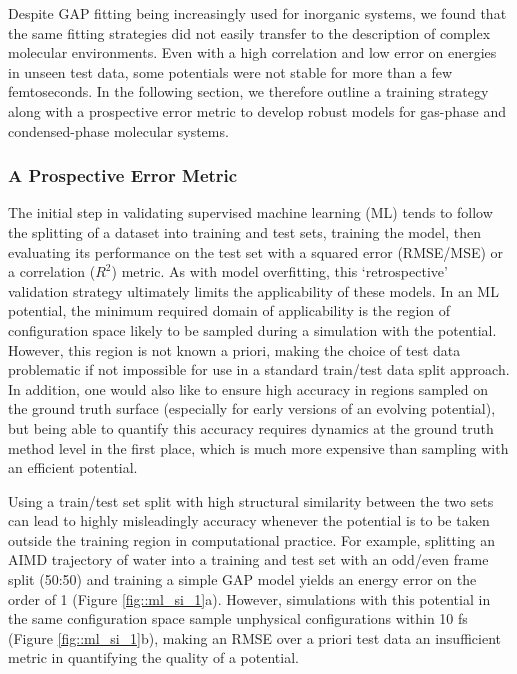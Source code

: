 \documentclass[../../main.tex]{subfiles}
\begin{document}
Despite GAP fitting being increasingly used for inorganic systems, we found that the same fitting strategies did not easily transfer to the description of complex molecular environments. Even with a high correlation and low error on energies in unseen test data, some potentials were not stable for more than a few femtoseconds. In the following section, we therefore outline a training strategy along with a prospective error metric to develop robust models for gas-phase and condensed-phase molecular systems.

\subsubsection{A Prospective Error Metric}

The initial step in validating supervised machine learning (ML) tends to follow the splitting of a dataset into training and test sets, training the model, then evaluating its performance on the test set with a squared error (RMSE/MSE) or a correlation ($R^2$) metric. As with model overfitting, this ‘retrospective’ validation strategy ultimately limits the applicability of these models.\cite{Kearnes2021, Cawley2010, Kramer2010, Li2017jcim, Chen2019plos, Kovacs2021, Sheridan2013} In an ML potential, the minimum required domain of applicability is the region of configuration space likely to be sampled during a simulation with the potential. However, this region is not known a priori, making the choice of test data problematic if not impossible for use in a standard train/test data split approach. In addition, one would also like to ensure high accuracy in regions sampled on the ground truth surface (especially for early versions of an evolving potential), but being able to quantify this accuracy requires dynamics at the ground truth method level in the first place, which is much more expensive than sampling with an efficient potential. 

Using a train/test set split with high structural similarity between the two sets can lead to highly misleadingly accuracy whenever the potential is to be taken outside the training region in computational practice. For example, splitting an AIMD trajectory of water into a training and test set with an odd/even frame split (50:50) and training a simple GAP model yields an energy error on the order of 1 \kcalx (Figure \ref{fig::ml_si_1}a). However, simulations with this potential in the same configuration space sample unphysical configurations within 10 fs (Figure \ref{fig::ml_si_1}b), making an RMSE over a priori test data an insufficient metric in quantifying the quality of a potential. 
\end{document}
